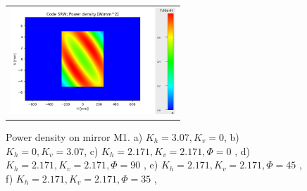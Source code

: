\documentclass[]{spie}  %
\begin{document}
\begin{figure} [ht]
\begin{center}
\begin{tabular}{l}
      \includegraphics[height=4cm]{figures/powerdensityKhKv35.png}
\end{tabular}
\end{center}
\caption[example] 
{ \label{fig:M1powerdensity} 
Power density on mirror M1.
a) $K_h=3.07, K_v=0$,
b) $K_h=0,K_v=3.07$,
c) $K_h=2.171,K_v=2.171, \Phi=0$ \textdegree,
d) $K_h=2.171,K_v=2.171, \Phi=90$ \textdegree,
e) $K_h=2.171,K_v=2.171, \Phi=45$ \textdegree,
f) $K_h=2.171,K_v=2.171, \Phi=35$ \textdegree,
}
\end{figure} 

\newpage 
\end{document}
